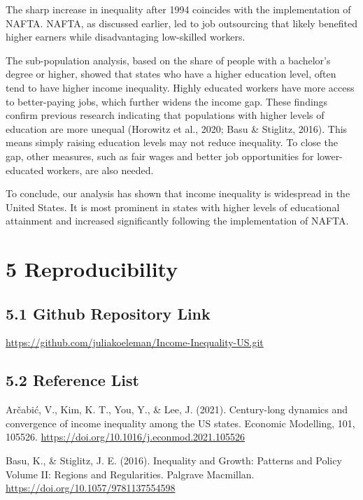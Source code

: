 \documentclass[
]{article}
\begin{document}
The sharp increase in inequality after 1994 coincides with the
implementation of NAFTA. NAFTA, as discussed earlier, led to job
outsourcing that likely benefited higher earners while disadvantaging
low-skilled workers.

The sub-population analysis, based on the share of people with a
bachelor's degree or higher, showed that states who have a higher
education level, often tend to have higher income inequality. Highly
educated workers have more access to better-paying jobs, which further
widens the income gap. These findings confirm previous research
indicating that populations with higher levels of education are more
unequal (Horowitz et al., 2020; Basu \& Stiglitz, 2016). This means
simply raising education levels may not reduce inequality. To close the
gap, other measures, such as fair wages and better job opportunities for
lower-educated workers, are also needed.

To conclude, our analysis has shown that income inequality is widespread
in the United States. It is most prominent in states with higher levels
of educational attainment and increased significantly following the
implementation of NAFTA.

\section{5 Reproducibility}\label{reproducibility}

\subsection{5.1 Github Repository Link}\label{github-repository-link}

\url{https://github.com/juliakoeleman/Income-Inequality-US.git}

\subsection{5.2 Reference List}\label{reference-list}

Arčabić, V., Kim, K. T., You, Y., \& Lee, J. (2021). Century-long
dynamics and convergence of income inequality among the US states.
Economic Modelling, 101, 105526.
\url{https://doi.org/10.1016/j.econmod.2021.105526}

Basu, K., \& Stiglitz, J. E. (2016). Inequality and Growth: Patterns and
Policy Volume II: Regions and Regularities. Palgrave Macmillan.
\url{https://doi.org/10.1057/9781137554598}
\end{document}
